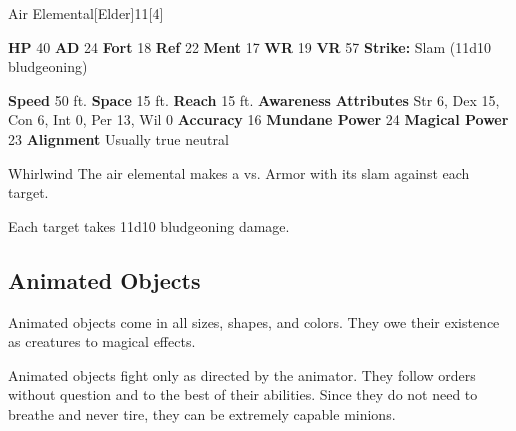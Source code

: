   \begin{monsubsection}{Air Elemental}[Elder]{11}[4]
    \vspace{-1em}\vspace{-1em}
    \vspace{0em}

    
    

    \begin{spellcontent}
      \begin{spelltargetinginfo}
        \pari \textbf{HP} 40 \monsep
          \textbf{AD} 24 \monsep
          \textbf{Fort} 18 \monsep
          \textbf{Ref} 22 \monsep
          \textbf{Ment} 17
        \pari \textbf{WR} 19 \monsep
        \textbf{VR} 57
        \pari \textbf{Strike:}
            Slam  (11d10 bludgeoning)
      \end{spelltargetinginfo}
    \end{spellcontent}
    \begin{monsterfooter}
      \pari \textbf{Speed} 50 ft. \monsep
        \textbf{Space} 15 ft. \monsep
        \textbf{Reach} 15 ft.
      \pari \textbf{Awareness} 
      \pari \textbf{Attributes}
        Str 6, Dex 15,
        Con 6, Int 0,
        Per 13, Wil 0
      \pari \textbf{Accuracy} 16 \monsep
        \textbf{Mundane Power} 24 \monsep
      \textbf{Magical Power} 23
      \pari \textbf{Alignment} Usually true neutral
    \end{monsterfooter}
  \end{monsubsection}
  \begin{freeability}{Whirlwind}
       The air elemental makes a 
         vs. Armor
        with its slam against each target.
    
    \hit Each target takes 11d10 bludgeoning damage.
    \end{freeability}
  
  
    \subsection{Animated Objects}
      
    Animated objects come in all sizes, shapes, and colors. They owe their existence as creatures to magical effects.

    Animated objects fight only as directed by the animator. They follow orders without question and to the best of their abilities. Since they do not need to breathe and never tire, they can be extremely capable minions.
  

